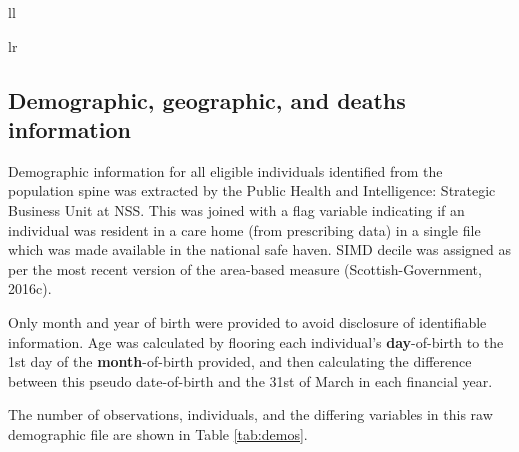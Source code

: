 \documentclass[12pt,a4paper,oneside,table]{report}
\begin{document}
\begin{tabular}[t]{ll}
\begin{tabular}{lr}
{\subsection{Demographic, geographic, and deaths information}\label{subsubsec:nrs-summs}

Demographic information for all eligible individuals identified from the
population spine was extracted by the Public Health and Intelligence:
Strategic Business Unit at NSS. This was joined with a flag variable
indicating if an individual was resident in a care home (from
prescribing data) in a single file which was made available in the
national safe haven. SIMD decile was assigned as per the most recent
version of the area-based measure (Scottish-Government, 2016c).

Only month and year of birth were provided to avoid disclosure of
identifiable information. Age was calculated by flooring each
individual's \textbf{day}-of-birth to the 1st day of the
\textbf{month}-of-birth provided, and then calculating the difference
between this pseudo date-of-birth and the 31st of March in each
financial year.

The number of observations, individuals, and the differing variables in
this raw demographic file are shown in Table \ref{tab:demos}.

\begin{table}[h]
\centering
{}
\caption{Demographic file variables}
\label{tab:demos}
\end{table}

}
\end{tabular}
\end{tabular}
\end{document}
